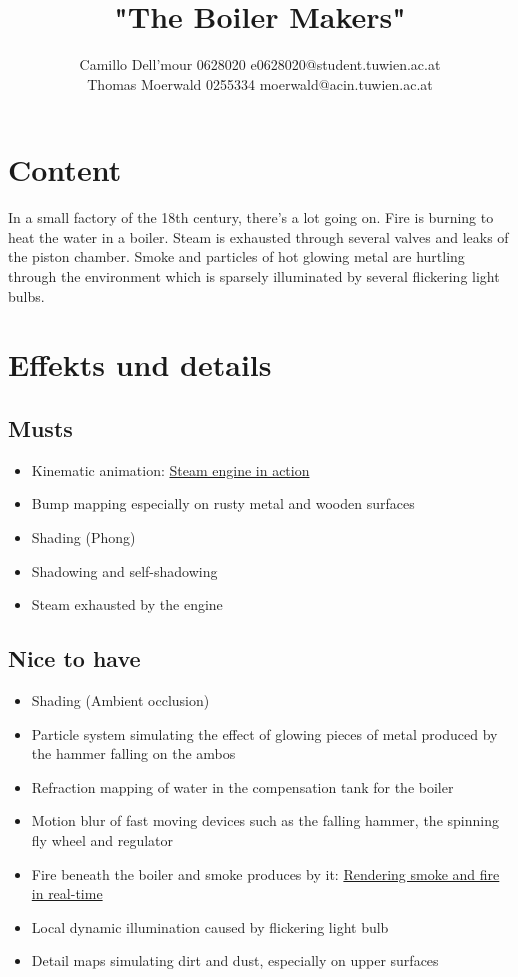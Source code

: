 \documentclass{scrartcl}
\title{"The Boiler Makers"}
\author{Camillo Dell'mour 0628020 e0628020@student.tuwien.ac.at\\ Thomas Moerwald 0255334 moerwald@acin.tuwien.ac.at}
\begin{document}
\maketitle

\section{Content}
In a small factory of the 18th century, there's a lot going on. Fire is burning to heat the water in a boiler. Steam is exhausted through several valves and leaks of the piston chamber. Smoke and particles of hot glowing metal are hurtling through the environment which is sparsely illuminated by several flickering light bulbs.

\section{Effekts und details}
\subsection*{Musts}
\begin{itemize}
	\item Kinematic animation: \href{http://en.wikipedia.org/wiki/File:Steam_engine_in_action.gif}{Steam engine in action}
	\item Bump mapping especially on rusty metal and wooden surfaces \cite{moeller1999realtime, dietrich2000hardware}
	\item Shading (Phong) \cite{phong1975illumination}
	\item Shadowing and self-shadowing \cite{nagy2000realtime, king2000ground}
	\item Steam exhausted by the engine \cite{van2000building}
\end{itemize}
\subsection*{Nice to have}
\begin{itemize}
	\item Shading (Ambient occlusion) \cite{hoberock2000high}
	\item Particle system simulating the effect of glowing pieces of metal produced by the hammer falling on the ambos \cite{van2000building}
	\item Refraction mapping of water in the compensation tank for the boiler \cite{vlachos2000refraction}
	\item Motion blur of fast moving devices such as the falling hammer, the spinning fly wheel and regulator \cite{rosado2007motion}
	\item Fire beneath the boiler and smoke produces by it: \href{http://graphics.ethz.ch/teaching/former/imagesynthesis_06/miniprojects/p3/index.html}{Rendering smoke and fire in real-time}
	\item Local dynamic illumination caused by flickering light bulb
	\item Detail maps simulating dirt and dust, especially on upper surfaces
\end{itemize}
\end{document}
